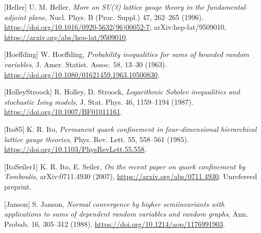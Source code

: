 \documentclass[10pt,letterpaper,twocolumn]{article}
\begin{document}
{[}Heller{]} U. M. Heller, \emph{More on SU(3) lattice gauge theory in the fundamental--adjoint plane}, Nucl. Phys. B (Proc. Suppl.) 47, 262--265 (1996). \href{https://doi.org/10.1016/0920-5632(96)00052-7}{https:\allowbreak{}/\allowbreak{}/\allowbreak{}doi.\allowbreak{}org/\allowbreak{}10.\allowbreak{}1016/\allowbreak{}0920-\allowbreak{}5632(\allowbreak{}96)\allowbreak{}00052-\allowbreak{}7}; arXiv:hep-lat/9509010, \href{https://arxiv.org/abs/hep-lat/9509010}{https:\allowbreak{}/\allowbreak{}/\allowbreak{}arxiv.\allowbreak{}org/\allowbreak{}abs/\allowbreak{}hep-\allowbreak{}lat/\allowbreak{}9509010}.

{[}Hoeffding{]} W. Hoeffding, \emph{Probability inequalities for sums of bounded random variables}, J. Amer. Statist. Assoc. 58, 13--30 (1963). \href{https://doi.org/10.1080/01621459.1963.10500830}{https:\allowbreak{}/\allowbreak{}/\allowbreak{}doi.\allowbreak{}org/\allowbreak{}10.\allowbreak{}1080/\allowbreak{}01621459\allowbreak{}.\allowbreak{}1963.\allowbreak{}10500830}.

{[}HolleyStroock{]} R. Holley, D. Stroock, \emph{Logarithmic Sobolev inequalities and stochastic Ising models}, J. Stat. Phys. 46, 1159--1194 (1987). \href{https://doi.org/10.1007/BF01011161}{https:\allowbreak{}/\allowbreak{}/\allowbreak{}doi.\allowbreak{}org/\allowbreak{}10.\allowbreak{}1007/\allowbreak{}BF010111\allowbreak{}61}.

{[}Ito85{]} K. R. Ito, \emph{Permanent quark confinement in four-dimensional hierarchical lattice gauge theories}, Phys. Rev. Lett. 55, 558--561 (1985). \href{https://doi.org/10.1103/PhysRevLett.55.558}{https:\allowbreak{}/\allowbreak{}/\allowbreak{}doi.\allowbreak{}org/\allowbreak{}10.\allowbreak{}1103/\allowbreak{}PhysRevL\allowbreak{}ett.\allowbreak{}55.\allowbreak{}558}.

{[}ItoSeiler1{]} K. R. Ito, E. Seiler, \emph{On the recent paper on quark confinement by Tomboulis}, arXiv:0711.4930 (2007), \href{https://arxiv.org/abs/0711.4930}{https:\allowbreak{}/\allowbreak{}/\allowbreak{}arxiv.\allowbreak{}org/\allowbreak{}abs/\allowbreak{}0711.\allowbreak{}4930}. Unrefereed preprint.

{[}Janson{]} S. Janson, \emph{Normal convergence by higher semiinvariants with applications to sums of dependent random variables and random graphs}, Ann. Probab. 16, 305--312 (1988). \href{https://doi.org/10.1214/aop/1176991903}{https:\allowbreak{}/\allowbreak{}/\allowbreak{}doi.\allowbreak{}org/\allowbreak{}10.\allowbreak{}1214/\allowbreak{}aop/\allowbreak{}11769919\allowbreak{}03}.
\end{document}
